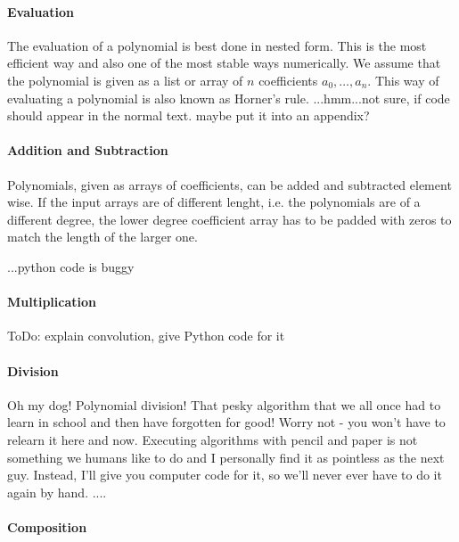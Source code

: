 \paragraph{Evaluation}
The evaluation of a polynomial is best done in nested form. This is the most efficient way and also one of the most stable ways numerically. We assume that the polynomial is given as a list or array of $n$ coefficients $a_0, \ldots, a_n$.
This way of evaluating a polynomial is also known as Horner's rule.
...hmm...not sure, if code should appear in the normal text. maybe put it into an appendix?

\paragraph{Addition and Subtraction}
Polynomials, given as arrays of coefficients, can be added and subtracted element wise. If the input arrays are of different lenght, i.e. the polynomials are of a different degree, the lower degree coefficient array has to be padded with zeros to match the length of the larger one.

...python code is buggy

\paragraph{Multiplication}
ToDo: explain convolution, give Python code for it

\paragraph{Division}
Oh my dog! Polynomial division! That pesky algorithm that we all once had to learn in school and then have forgotten for good! Worry not - you won't have to relearn it here and now. Executing algorithms with pencil and paper is not something we humans like to do and I personally find it as pointless as the next guy. Instead, I'll give you computer code for it, so we'll never ever have to do it again by hand. ....

\paragraph{Composition}

